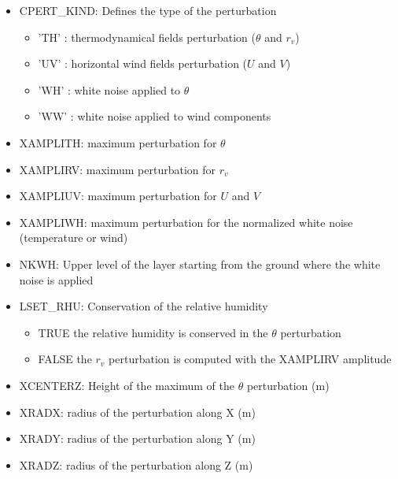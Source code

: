 \begin{itemize}

\item CPERT\_KIND: Defines the type of the perturbation
\begin{itemize}
\item 'TH' : thermodynamical fields perturbation ($\theta$ and $r_v$)
\item 'UV' : horizontal wind fields perturbation ($U$ and $V$)
\item 'WH' :  white noise applied to $\theta$
\item 'WW' :  white noise applied to wind components
\end{itemize}

\item XAMPLITH: maximum perturbation for $\theta$

\item XAMPLIRV: maximum perturbation  for $r_v$

\item XAMPLIUV: maximum perturbation for $U$ and $V$

\item XAMPLIWH: maximum perturbation for the normalized white noise (temperature or wind)

\item NKWH: Upper level of the layer starting from the ground where the white noise is applied

\item LSET\_RHU: Conservation of the relative humidity
\begin{itemize}
\item TRUE the relative humidity is conserved in the $\theta$ perturbation
\item FALSE the $r_v$ perturbation is computed with the XAMPLIRV amplitude
\end{itemize}

\item XCENTERZ: Height of the maximum of the $\theta$ perturbation (m)

\item XRADX: radius of the perturbation along X (m)

\item XRADY: radius of the perturbation along Y (m)

\item XRADZ: radius of the perturbation along Z (m)

\end{itemize}


